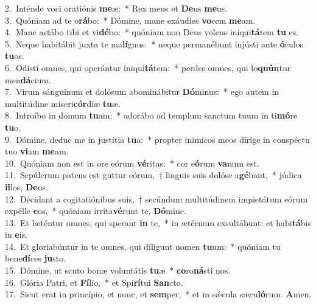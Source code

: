 {2.~}Inténde voci oratiónis \textbf{me}æ:~* Rex meus et \textbf{De}us \textbf{me}us.\\
{3.~}Quóniam ad te o\textbf{rá}bo:~* Dómine, mane exáudies \textbf{vo}cem \textbf{me}am.\\
{4.~}Mane astábo tibi et vi\textbf{dé}bo:~* quóniam non Deus volens iniqui\textbf{tá}tem \textbf{tu} es.\\
{5.~}Neque habitábit juxta te ma\textbf{lí}gnus:~* neque permanébunt injústi ante \textbf{ó}culos \textbf{tu}os.\\
{6.~}Odísti omnes, qui operántur iniqui\textbf{tá}tem:~* perdes omnes, qui lo\textbf{quún}tur men\textbf{dá}cium.\\
{7.~}Virum sánguinum et dolósum abominábitur \textbf{Dó}minus:~* ego autem in multitúdine miseri\textbf{cór}diæ \textbf{tu}æ.\\
{8.~}Introíbo in domum \textbf{tu}am:~* adorábo ad templum sanctum tuum in ti\textbf{mó}re \textbf{tu}o.\\
{9.~}Dómine, deduc me in justítia \textbf{tu}a:~* propter inimícos meos dírige in conspéctu tuo \textbf{vi}am \textbf{me}am.\\
{10.~}Quóniam non est in ore eórum \textbf{vé}ritas:~* cor e\textbf{ó}rum \textbf{va}num est.\\
{11.~}Sepúlcrum patens est guttur eórum,~† linguis suis dolóse a\textbf{gé}bant,~* júdica \textbf{il}los, \textbf{De}us.\\
{12.~}Décidant a cogitatiónibus suis,~† secúndum multitúdinem impietátum eórum expélle \textbf{e}os,~* quóniam irrita\textbf{vé}runt te, \textbf{Dó}mine.\\
{13.~}Et læténtur omnes, qui sperant \textbf{in} te,~* in ætérnum exsultábunt: et habi\textbf{tá}bis in \textbf{e}is.\\
{14.~}Et gloriabúntur in te omnes, qui díligunt nomen \textbf{tu}um:~* quóniam tu bene\textbf{dí}ces \textbf{ju}sto.\\
{15.~}Dómine, ut scuto bonæ voluntátis \textbf{tu}æ~* \textbf{co}ro\textbf{ná}sti nos.\\
{16.~}Glória Patri, et \textbf{Fí}lio,~* et Spi\textbf{rí}tui \textbf{San}cto.\\
{17.~}Sicut erat in princípio, et nunc, et \textbf{sem}per,~* et in sǽcula sæcu\textbf{ló}rum. \textbf{A}men.\\
